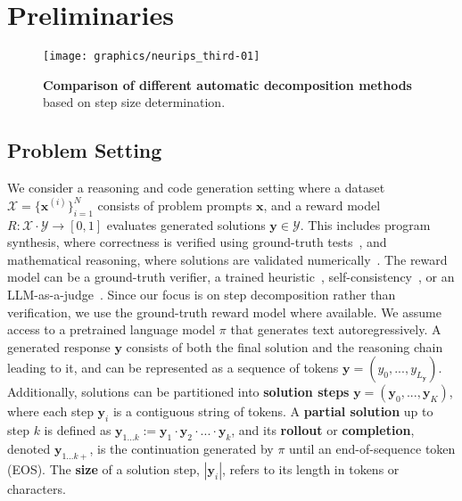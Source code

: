 \section{Preliminaries}

\begin{figure*}
    \vspace{-0.2cm}
    \centering
    \texttt{[image: graphics/neurips\_third-01]}
    \vspace{-0.3cm}
    \caption{\textbf{Comparison of different automatic decomposition methods} based on step size determination.}
    \label{fig:decomp_comparison}\vspace{-0.4cm}
\end{figure*}

\subsection{Problem Setting}


We consider a reasoning and code generation setting where a dataset $\mathcal{X} = \{\boldsymbol{x}^{(i)}\}_{i=1}^{N}$ consists of problem prompts $\boldsymbol{x}$, and a reward model $R: \mathcal{X} \cdot \mathcal{Y} \rightarrow [0,1]$ evaluates generated solutions $\boldsymbol{y} \in \mathcal{Y}$. This includes program synthesis, where correctness is verified using ground-truth tests~\citep{chen2021evaluating, austin2021program}, and mathematical reasoning, where solutions are validated numerically~\citep{hendrycks2021measuring, cobbe2021training}. The reward model can be a ground-truth verifier, a trained heuristic~\citep{zhang2024generativeverifiersrewardmodeling}, self-consistency~\citep{wang2023selfconsistency}, or an LLM-as-a-judge~\citep{zheng2023judgingllmasajudgemtbenchchatbot}. Since our focus is on step decomposition rather than verification, we use the ground-truth reward model where available. We assume access to a pretrained language model $\pi$ that generates text autoregressively. A generated response $\boldsymbol{y}$ consists of both the final solution and the reasoning chain leading to it, and can be represented as a sequence of tokens $\boldsymbol{y} = (y_0, ..., y_{L_{\boldsymbol{y}}})$. Additionally, solutions can be partitioned into \textbf{solution steps} $\boldsymbol{y} = (\boldsymbol{y}_0, ..., \boldsymbol{y}_K)$, where each step $\boldsymbol{y}_i$ is a contiguous string of tokens. A \textbf{partial solution} up to step $k$ is defined as $\boldsymbol{y}_{1...k} := \boldsymbol{y}_1 \cdot \boldsymbol{y}_2 \cdot ... \cdot \boldsymbol{y}_k$, and its \textbf{rollout} or \textbf{completion}, denoted $\boldsymbol{y}_{1...k+}$, is the continuation generated by $\pi$ until an end-of-sequence token (\textsc{EOS}). The \textbf{size} of a solution step, $|\boldsymbol{y}_i|$, refers to its length in tokens or characters.


